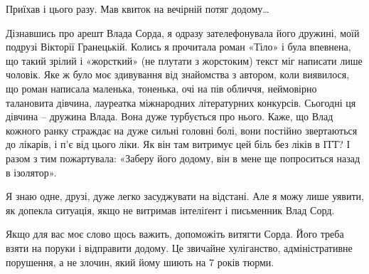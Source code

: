 Приїхав і цього разу. Мав квиток на вечірній потяг додому… 

Дізнавшись про арешт Влада Сорда, я одразу зателефонувала його дружині, моїй
подрузі Вікторії Гранецькій. Колись я прочитала роман «Тіло» і була впевнена,
що такий зрілий і «жорсткий» (не плутати з жорстоким) текст міг написати лише
чоловік. Яке ж було моє здивування від знайомства з автором, коли виявилося, що
роман написала маленька, тоненька, очі на пів обличчя, неймовірно талановита
дівчина, лауреатка міжнародних літературних конкурсів. Сьогодні ця дівчина –
дружина Влада. Вона дуже турбується про нього. Каже, що Влад кожного ранку
страждає на дуже сильні головні болі, вони постійно звертаються до лікарів, і
п’є від цього ліки.  Як він там витримує цей біль без ліків в ІТТ?  І разом з
тим пожартувала: «Заберу його додому, він в мене ще попроситься назад в
ізолятор».

Я знаю одне, друзі, дуже легко засуджувати на відстані. Але я можу лише уявити,
як допекла ситуація, якщо не витримав інтеліґент і письменник Влад Сорд.

Якщо для вас моє слово щось важить, допоможіть витягти Сорда. Його треба взяти
на поруки і відправити додому. Це звичайне хуліганство, адміністративне
порушення, а не злочин, який йому шиють на 7 років тюрми.
